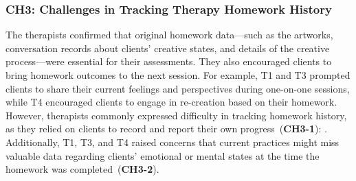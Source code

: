 
\subsubsection{\textbf{CH3}: Challenges in Tracking Therapy Homework History} 

The therapists confirmed that original homework data---such as the artworks, conversation records about clients' creative states, and details of the creative process---were essential for their assessments. They also encouraged clients to bring homework outcomes to the next session. For example, T1 and T3 prompted clients to share their current feelings and perspectives during one-on-one sessions, while T4 encouraged clients to engage in re-creation based on their homework.
However, therapists commonly expressed difficulty in tracking homework history, as they relied on clients to record and report their own progress~(\textbf{CH3-1}): . Additionally, T1, T3, and T4 raised concerns that current practices might miss valuable data regarding clients' emotional or mental states at the time the homework was completed~(\textbf{CH3-2}).

